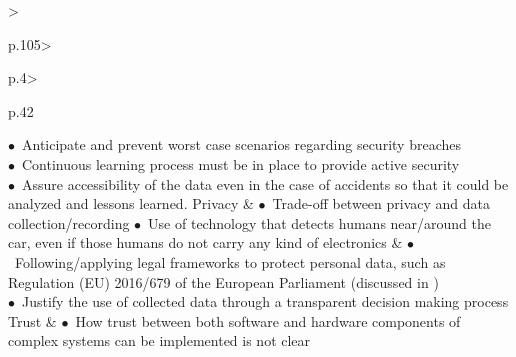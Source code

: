 \begin{table}[t]
\begin{small}
\begin{supertabular}{%
		>{\raggedright}p{.105\textwidth}>{\raggedright}p{.4\textwidth}>{\raggedright}p{.42\textwidth}}
					\noindent $\bullet$~Anticipate and prevent worst case scenarios regarding security breaches\\
					\noindent $\bullet$~Continuous learning process must be in place to provide active security\\
					\noindent $\bullet$~Assure accessibility of the data even in the case of accidents so that it could be analyzed and lessons learned. \vspace{.2cm}%
 		     \tabularnewline \hline %
			\vspace{.1cm}Privacy & \vspace{.1cm}
				\noindent $\bullet$~Trade-off between privacy and data collection/recording
				\noindent $\bullet$~Use of technology that detects humans near/around the car, even if those humans do not carry any kind of electronics  
			& \vspace{.1cm}
				\noindent $\bullet$~Following/applying legal frameworks to protect personal data, such as Regulation (EU) 2016/679 of the European Parliament \cite{EuropeanUnion2016} (discussed in \cite{doi:10.1093/idpl/ipx005})\\
				\noindent $\bullet$~Justify the use of collected data through a transparent decision making process \vspace{.2cm} %
 			 \tabularnewline \hline %
			\vspace{.1cm}Trust & \vspace{.1cm}
				\noindent $\bullet$~How trust between both software and hardware components of complex systems can be implemented is not clear

\end{supertabular}
\end{small}
\end{table}
